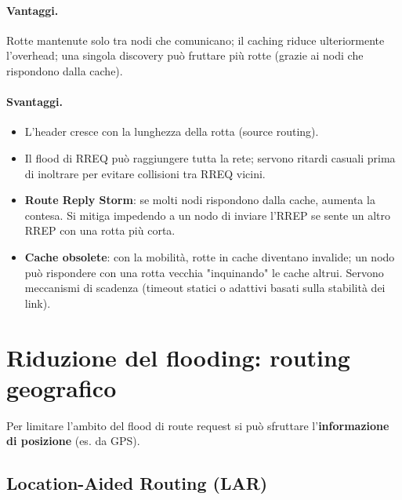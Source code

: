 
\paragraph{Vantaggi.} Rotte mantenute solo tra nodi che comunicano; il caching riduce ulteriormente l'overhead; una singola discovery può fruttare più rotte (grazie ai nodi che rispondono dalla cache).

\paragraph{Svantaggi.}
\begin{itemize}
    \item L'header cresce con la lunghezza della rotta (source routing).
    \item Il flood di RREQ può raggiungere tutta la rete; servono ritardi casuali prima di inoltrare per evitare collisioni tra RREQ vicini.
    \item \textbf{Route Reply Storm}: se molti nodi rispondono dalla cache, aumenta la contesa. Si mitiga impedendo a un nodo di inviare l'RREP se sente un altro RREP con una rotta più corta.
    \item \textbf{Cache obsolete}: con la mobilità, rotte in cache diventano invalide; un nodo può rispondere con una rotta vecchia "inquinando" le cache altrui. Servono meccanismi di scadenza (timeout statici o adattivi basati sulla stabilità dei link).
\end{itemize}

\section{Riduzione del flooding: routing geografico}
Per limitare l'ambito del flood di route request si può sfruttare l'\textbf{informazione di posizione} (es. da GPS).

\subsection{Location-Aided Routing (LAR)}

